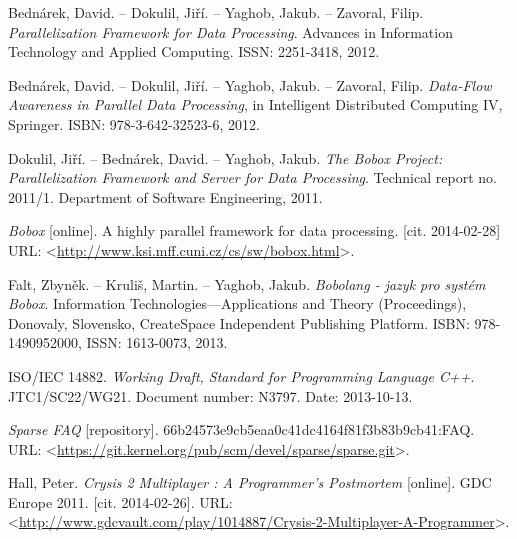 
\def\bibname{References}
\begin{thebibliography}{99}
\addcontentsline{toc}{chapter}{\bibname}


	{\sc Bednárek}, David. -- {\sc Dokulil}, Jiří. -- {\sc Yaghob}, Jakub. -- {\sc Zavoral}, Filip.
	\emph{Parallelization Framework for Data Processing}.
	Advances in Information Technology and Applied Computing.
	ISSN: 2251-3418, 2012.
	
	{\sc Bednárek}, David. -- {\sc Dokulil}, Jiří. -- {\sc Yaghob}, Jakub. -- {\sc Zavoral}, Filip.
	\emph{Data-Flow Awareness in Parallel Data Processing},
	in Intelligent Distributed Computing IV, Springer.
	ISBN: 978-3-642-32523-6, 2012.

	{\sc Dokulil}, Jiří. -- {\sc Bednárek}, David. -- {\sc Yaghob}, Jakub.
	\emph{The Bobox Project: Parallelization Framework and Server for Data Processing}.
	Technical report no. 2011/1.
	Department of Software Engineering, 2011.
	
	\emph{Bobox} [online].
	A highly parallel framework for data processing.
	[cit. 2014-02-28]
	URL: <\url{http://www.ksi.mff.cuni.cz/cs/sw/bobox.html}>.

	{\sc Falt}, Zbyněk. -- {\sc Kruliš}, Martin. -- {\sc Yaghob}, Jakub.
	\emph{Bobolang - jazyk pro systém Bobox}.
	Information Technologies—Applications and Theory (Proceedings), Donovaly, Slovensko, CreateSpace Independent Publishing Platform.
	ISBN: 978-1490952000, ISSN: 1613-0073, 2013.
	
	ISO/IEC 14882.
	\emph{Working Draft, Standard for Programming Language C++}.
	JTC1/SC22/WG21.
	Document number: N3797.
	Date: 2013-10-13.
	
	\emph{Sparse FAQ} [repository].
	66b24573e9cb5eaa0c41dc4164f81f3b83b9cb41:FAQ.
	URL: <\url{https://git.kernel.org/pub/scm/devel/sparse/sparse.git}>.
	
	{\sc Hall}, Peter.
	\emph{Crysis 2 Multiplayer : A Programmer's Postmortem} [online].
	GDC Europe 2011.
	[cit. 2014-02-26].
	URL: <\url{http://www.gdcvault.com/play/1014887/Crysis-2-Multiplayer-A-Programmer}>.
	

\end{thebibliography}
